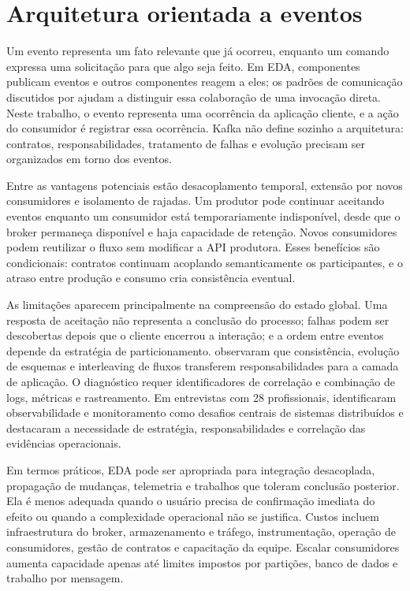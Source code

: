 \section{Arquitetura orientada a eventos}

Um evento representa um fato relevante que já ocorreu, enquanto um comando expressa uma solicitação para que algo seja feito. Em EDA, componentes publicam eventos e outros componentes reagem a eles; os padrões de comunicação discutidos por  ajudam a distinguir essa colaboração de uma invocação direta. Neste trabalho, o evento representa uma ocorrência da aplicação cliente, e a ação do consumidor é registrar essa ocorrência. Kafka não define sozinho a arquitetura: contratos, responsabilidades, tratamento de falhas e evolução precisam ser organizados em torno dos eventos.

Entre as vantagens potenciais estão desacoplamento temporal, extensão por novos consumidores e isolamento de rajadas. Um produtor pode continuar aceitando eventos enquanto um consumidor está temporariamente indisponível, desde que o broker permaneça disponível e haja capacidade de retenção. Novos consumidores podem reutilizar o fluxo sem modificar a API produtora. Esses benefícios são condicionais: contratos continuam acoplando semanticamente os participantes, e o atraso entre produção e consumo cria consistência eventual.

As limitações aparecem principalmente na compreensão do estado global. Uma resposta de aceitação não representa a conclusão do processo; falhas podem ser descobertas depois que o cliente encerrou a interação; e a ordem entre eventos depende da estratégia de particionamento.  observaram que consistência, evolução de esquemas e interleaving de fluxos transferem responsabilidades para a camada de aplicação. O diagnóstico requer identificadores de correlação e combinação de logs, métricas e rastreamento. Em entrevistas com 28 profissionais,  identificaram observabilidade e monitoramento como desafios centrais de sistemas distribuídos e destacaram a necessidade de estratégia, responsabilidades e correlação das evidências operacionais.

Em termos práticos, EDA pode ser apropriada para integração desacoplada, propagação de mudanças, telemetria e trabalhos que toleram conclusão posterior. Ela é menos adequada quando o usuário precisa de confirmação imediata do efeito ou quando a complexidade operacional não se justifica. Custos incluem infraestrutura do broker, armazenamento e tráfego, instrumentação, operação de consumidores, gestão de contratos e capacitação da equipe. Escalar consumidores aumenta capacidade apenas até limites impostos por partições, banco de dados e trabalho por mensagem.

